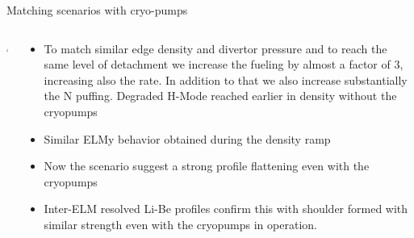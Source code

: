 \documentclass[10pt, compress]{beamer}
\newcommand\Fontvi{\fontsize{8}{7.2}\selectfont}
\begin{document}
\begin{frame}{Matching scenarios with cryo-pumps}
\Fontvi
  \vspace{-1cm}
\begin{columns}
  \begin{column}{0.65\textwidth}
    4
  \end{column}
  \begin{column}{0.35\textwidth}
    \begin{itemize}
      \item<1-> To match similar edge density and divertor pressure
        and to reach the same level of detachment we increase the
        fueling by almost a factor of 3, increasing also the rate. In
        addition to that we also increase substantially the N
        puffing. \alert{Degraded H-Mode reached earlier in density
          without the cryopumps}
      \item<2-> Similar ELMy behavior obtained during the density ramp  
      \item<3-> Now the scenario suggest a strong profile flattening
        even with the cryopumps
       \item<4> Inter-ELM resolved Li-Be profiles confirm this with
         shoulder formed with similar strength even with the cryopumps
         in operation.
    \end{itemize}
  \end{column}
\end{columns}
\end{frame}
\end{document}

